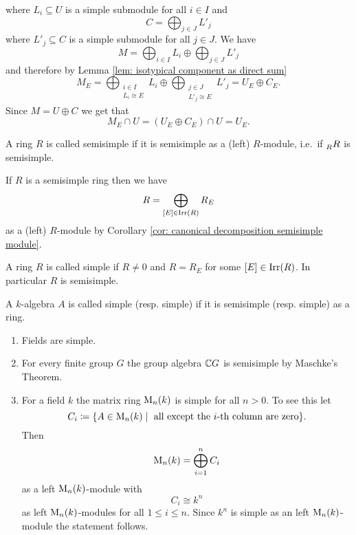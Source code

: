 \begin{rem}
\begin{enumerate}[label=\emph{\alph*})]
  where $L_i \subseteq U$ is a simple submodule for all $i \in I$ and
  \[
   C = \bigoplus_{j \in J} L'_j
  \]
  where $L'_j \subseteq C$ is a simple submodule for all $j \in J$. We have
  \[
   M = \bigoplus_{i \in I} L_i \oplus \bigoplus_{j \in J} L'_j
  \]
  and therefore by Lemma \ref{lem: isotypical component as direct sum}
  \[
   M_E
   = \bigoplus_{\substack{i \in I \\ L_i \cong E}} L_i \oplus \bigoplus_{\substack{j \in J \\ L'_j \cong E}} L'_j
   = U_E \oplus C_E.
  \]
  Since $M = U \oplus C$ we get that
  \[
   M_E \cap U = (U_E \oplus C_E) \cap U = U_E.
  \]
 \end{enumerate}
\end{rem}


\begin{defi}
 A ring $R$ is called semisimple if it is semisimple as a (left) $R$-module, i.e.\ if $\prescript{}{R}{R}$ is semisimple.
\end{defi}


If $R$ is a semisimple ring then we have
\[
 R = \bigoplus_{[E] \in \operatorname{Irr}(R)} R_E
\]
as a (left) $R$-module by Corollary \ref{cor: canonical decomposition semisimple module}.


\begin{defi}
 A ring $R$ is called simple if $R \neq 0$ and $R = R_E$ for some \mbox{$[E] \in \operatorname{Irr}(R)$}. In particular $R$ is semisimple.
\end{defi}


\begin{defi}
 A $k$-algebra $A$ is called simple (resp. simple) if it is semisimple (resp. simple) as a ring.
\end{defi}


\begin{expls}
 \begin{enumerate}[label=\emph{\alph*})]
  \item
  Fields are simple.
  \item
  For every finite group $G$ the group algebra $\mathbb{C} G$ is semisimple by Maschke’s Theorem.
  \item
  For a field $k$ the matrix ring $\operatorname{M}_n(k)$ is simple for all $n > 0$. To see this let
  \[
   C_i
   \coloneqq \{ A \in \operatorname{M}_n(k) \mid \text{ all except the $i$-th column are zero} \}.
  \]
  Then
  \[
   \operatorname{M}_n(k) = \bigoplus_{i=1}^n C_i
  \]
  as a left $\operatorname{M}_n(k)$-module with
  \[
   C_i \cong k^n
  \]
  as left $\operatorname{M}_n(k)$-modules for all $1 \leq i \leq n$. Since $k^n$ is simple as an left \mbox{$\operatorname{M}_n(k)$-module} the statement follows.
 \end{enumerate}
\end{expls}


